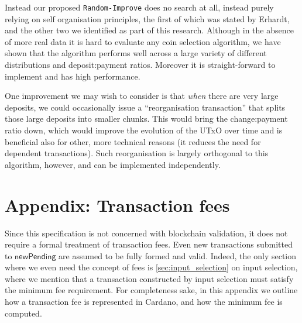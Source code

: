 \documentclass{article}
\theoremstyle{definition}{
  \newtheorem{lemma}{Lemma}[section] %
  \newtheorem{definition}[lemma]{Definition}
}
\theoremstyle{theorem}{
  \newtheorem{invariant}[lemma]{Invariant}
  \newtheorem{proofobligation}[lemma]{Proof Obligation}
}
\numberwithin{equation}{lemma}
\begin{document}
Instead our proposed \texttt{Random-Improve} does no search at all, instead purely
relying on self organisation principles, the first of which was stated by
Erhardt, and the other two we identified as part of this research. Although
in the absence of more real data it is hard to evaluate any coin selection
algorithm, we have shown that the algorithm performs well across a large
variety of different distributions and deposit:payment ratios. Moreover it is
straight-forward to implement and has high performance.

One improvement we may wish to consider is that \emph{when} there are very large
deposits, we could occasionally issue a ``reorganisation transaction'' that
splits those large deposits into smaller chunks. This would bring the
change:payment ratio down, which would improve the evolution of the UTxO over
time and is beneficial also for other, more technical reasons (it reduces the
need for dependent transactions). Such reorganisation is largely orthogonal to
this algorithm, however, and can be implemented independently.

\section{Appendix: Transaction fees}
\label{app:transaction_fees}

Since this specification is not concerned with blockchain validation, it does
not require a formal treatment of transaction fees. Even new transactions
submitted to $\mathsf{newPending}$ are assumed to be fully formed and valid.
Indeed, the only section where we even need the concept of fees is
\cref{sec:input_selection} on input selection, where we mention that a
transaction constructed by input selection must satisfy the minimum fee
requirement. For completeness sake, in this appendix we outline how a
transaction fee is represented in Cardano, and how the minimum fee is computed.
\end{document}
